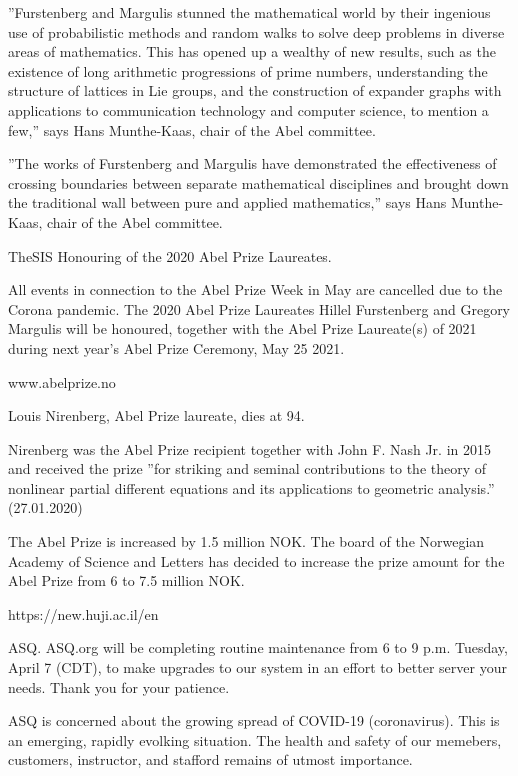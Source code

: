 ''Furstenberg and Margulis stunned the
mathematical world by their ingenious use of
probabilistic methods and random walks to
solve deep problems in diverse areas of
mathematics. This has opened up a wealthy
of new results, such as the existence
of long arithmetic progressions of prime
numbers, understanding the structure of
lattices in Lie groups, and the
construction of expander graphs with
applications to communication technology
and computer science, to mention a few,''
says Hans Munthe-Kaas, chair of the
Abel committee.

''The works of Furstenberg and Margulis
have demonstrated the effectiveness of
crossing boundaries between separate
mathematical disciplines and brought
down the traditional wall between pure and
applied mathematics,'' says Hans
Munthe-Kaas, chair of the Abel committee.

TheSIS Honouring of the 2020 Abel
Prize Laureates.

All events in connection to the Abel Prize
Week in May are cancelled due to the Corona
pandemic. The 2020 Abel Prize Laureates
Hillel Furstenberg and Gregory Margulis
will be honoured, together with the Abel
Prize Laureate(s) of 2021 during next
year's Abel Prize Ceremony, May 25 2021.

www.abelprize.no

Louis Nirenberg, Abel Prize laureate, dies at 94.

Nirenberg was the Abel Prize recipient
together with John F. Nash Jr. in 2015
and received the prize ''for striking
and seminal contributions to the theory of
nonlinear partial different equations
and its applications to
geometric analysis.''
(27.01.2020)

The Abel Prize is increased by 1.5
million NOK.
The board of the Norwegian Academy of
Science and Letters has decided to increase
the prize amount for the Abel Prize from
6 to 7.5 million NOK.

https://new.huji.ac.il/en

\smallskip{}

\fi

ASQ.
ASQ.org will be completing routine
maintenance from 6 to 9 p.m. Tuesday,
April 7 (CDT), to make upgrades to our
system in an effort to better server
your needs.
Thank you for your patience.

ASQ is concerned about the growing
spread of COVID-19 (coronavirus).
This is an emerging,
rapidly evolking situation.
The health and safety of our memebers,
customers, instructor,
and stafford remains of utmost
importance.

